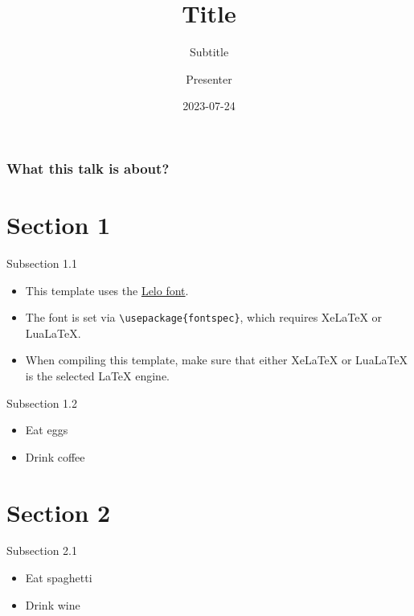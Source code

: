 \documentclass[
  10pt,
  ignorenonframetext,
  aspectratio=169,
xcolor = dvipsnames
]{beamer}
\title{Title}
\subtitle{Subtitle}
\author{Presenter}
\date{2023-07-24}
\institute{Institute}
\providecommand{\tightlist}{%
  \setlength{\itemsep}{0pt}\setlength{\parskip}{0pt}}
\begin{document}
\begin{frame}[plain]{}
  \titlepage
\end{frame}

\begin{frame}
  \frametitle{What this talk is about?}
  \tableofcontents
\end{frame}
\hypertarget{section-1}{%
\section{Section 1}\label{section-1}}

\begin{frame}[fragile]{Subsection 1.1}
\protect\hypertarget{subsection-1.1}{}
\begin{itemize}
\tightlist
\item
  This template uses the \href{https://camelot-typefaces.com/lelo}{Lelo
  font}.
\item
  The font is set via \texttt{\textbackslash{}usepackage\{fontspec\}},
  which requires XeLaTeX or LuaLaTeX.
\item
  When compiling this template, make sure that either XeLaTeX or
  LuaLaTeX is the selected LaTeX engine.
\end{itemize}
\end{frame}

\begin{frame}{Subsection 1.2}
\protect\hypertarget{subsection-1.2}{}
\begin{itemize}
\tightlist
\item
  Eat eggs
\item
  Drink coffee
\end{itemize}
\end{frame}

\hypertarget{section-2}{%
\section{Section 2}\label{section-2}}

\begin{frame}{Subsection 2.1}
\protect\hypertarget{subsection-2.1}{}
\begin{itemize}
\tightlist
\item
  Eat spaghetti
\item
  Drink wine
\end{itemize}
\end{frame}
\end{document}
